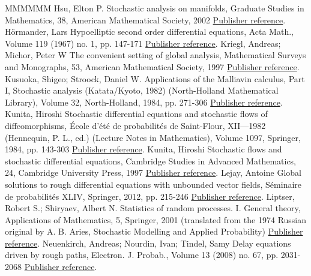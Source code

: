 \documentclass[11pt]{article}
\theoremstyle{definition}
\numberwithin{equation}{section}
\numberwithin{figure}{section}
\numberwithin{table}{section}
\begin{document}
\begin{thebibliography}{MMMMMM}
 Hsu, Elton P. Stochastic analysis on manifolds, Graduate Studies in Mathematics, 38, American Mathematical Society, 2002 \href{https://ahl.centre-mersenne.org/item/AHL_2020__3__1023_0/#Hsu}{Publisher reference}.
 Hörmander, Lars Hypoelliptic second order differential equations, Acta Math., Volume 119 (1967) no. 1, pp. 147-171 \href{https://ahl.centre-mersenne.org/item/AHL_2020__3__1023_0/#hormander1967}{Publisher reference}.
 Kriegl, Andreas; Michor, Peter W The convenient setting of global analysis, Mathematical Surveys and Monographs, 53, American Mathematical Society, 1997 \href{https://ahl.centre-mersenne.org/item/AHL_2020__3__1023_0/#kriegl-michor1997}{Publisher reference}.
 Kusuoka, Shigeo; Stroock, Daniel W. Applications of the Malliavin calculus, Part I, Stochastic analysis (Katata/Kyoto, 1982) (North-Holland Mathematical Library), Volume 32, North-Holland, 1984, pp. 271-306 \href{https://ahl.centre-mersenne.org/item/AHL_2020__3__1023_0/#KS1984}{Publisher reference}.
 Kunita, Hiroshi Stochastic differential equations and stochastic flows of diffeomorphisms, École d’été de probabilités de Saint-Flour, XII—1982 (Hennequin, P. L., ed.) (Lecture Notes in Mathematics), Volume 1097, Springer, 1984, pp. 143-303 \href{https://ahl.centre-mersenne.org/item/AHL_2020__3__1023_0/#K84}{Publisher reference}.
 Kunita, Hiroshi Stochastic flows and stochastic differential equations, Cambridge Studies in Advanced Mathematics, 24, Cambridge University Press, 1997 \href{https://ahl.centre-mersenne.org/item/AHL_2020__3__1023_0/#kunita1997}{Publisher reference}.
 Lejay, Antoine Global solutions to rough differential equations with unbounded vector fields, Séminaire de probabilités XLIV, Springer, 2012, pp. 215-246 \href{https://ahl.centre-mersenne.org/item/AHL_2020__3__1023_0/#lejay2012global}{Publisher reference}.
 Liptser, Robert S.; Shiryaev, Albert N. Statistics of random processes. I. General theory, Applications of Mathematics, 5, Springer, 2001 (translated from the 1974 Russian original by A. B. Aries, Stochastic Modelling and Applied Probability) \href{https://ahl.centre-mersenne.org/item/AHL_2020__3__1023_0/#LiShi2001}{Publisher reference}.
 Neuenkirch, Andreas; Nourdin, Ivan; Tindel, Samy Delay equations driven by rough paths, Electron. J. Probab., Volume 13 (2008) no. 67, pp. 2031-2068 \href{https://ahl.centre-mersenne.org/item/AHL_2020__3__1023_0/#nnt2008}{Publisher reference}.

\end{thebibliography}
\end{document}
